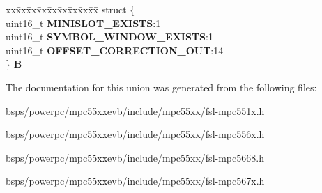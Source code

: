 \begin{DoxyCompactItemize}
\begin{tabbing}
\end{tabbing}\item 
\mbox{\label{unionuPCR9_a3442613428c69a0291ac5a6f92abb6a2}} 
\begin{tabbing}
xx\=xx\=xx\=xx\=xx\=xx\=xx\=xx\=xx\=\kill
struct \{\\
\>uint16\_t {\bfseries MINISLOT\_EXISTS}:1\\
\>uint16\_t {\bfseries SYMBOL\_WINDOW\_EXISTS}:1\\
\>uint16\_t {\bfseries OFFSET\_CORRECTION\_OUT}:14\\
\} {\bfseries B}\\

\end{tabbing}\end{DoxyCompactItemize}


The documentation for this union was generated from the following files\+:\begin{DoxyCompactItemize}
\item 
bsps/powerpc/mpc55xxevb/include/mpc55xx/fsl-\/mpc551x.\+h\item 
bsps/powerpc/mpc55xxevb/include/mpc55xx/fsl-\/mpc556x.\+h\item 
bsps/powerpc/mpc55xxevb/include/mpc55xx/fsl-\/mpc5668.\+h\item 
bsps/powerpc/mpc55xxevb/include/mpc55xx/fsl-\/mpc567x.\+h\end{DoxyCompactItemize}

